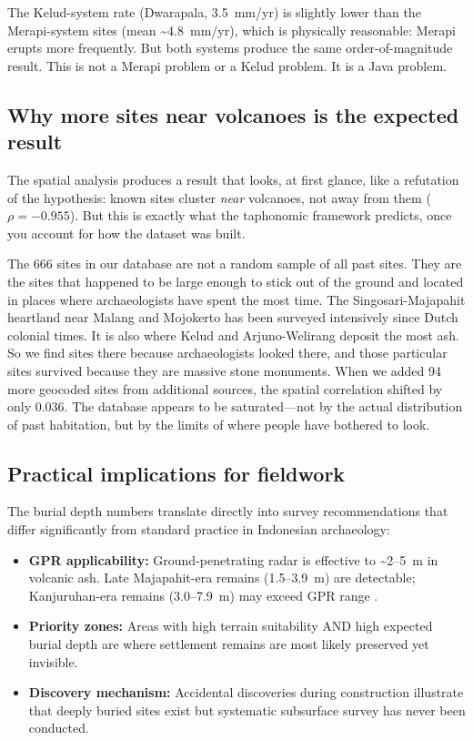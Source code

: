 \documentclass[egqsj, manuscript]{copernicus}
\begin{document}
The Kelud-system rate (Dwarapala, 3.5~mm/yr) is slightly lower than the Merapi-system sites (mean \textasciitilde4.8~mm/yr), which is physically reasonable: Merapi erupts more frequently. But both systems produce the same order-of-magnitude result. This is not a Merapi problem or a Kelud problem. It is a Java problem.

\subsection{Why more sites near volcanoes is the expected result}

The spatial analysis produces a result that looks, at first glance, like a refutation of the hypothesis: known sites cluster \textit{near} volcanoes, not away from them ($\rho = -0.955$). But this is exactly what the taphonomic framework predicts, once you account for how the dataset was built.

The 666 sites in our database are not a random sample of all past sites. They are the sites that happened to be large enough to stick out of the ground and located in places where archaeologists have spent the most time. The Singosari-Majapahit heartland near Malang and Mojokerto has been surveyed intensively since Dutch colonial times. It is also where Kelud and Arjuno-Welirang deposit the most ash. So we find sites there because archaeologists looked there, and those particular sites survived because they are massive stone monuments. When we added 94 more geocoded sites from additional sources, the spatial correlation shifted by only 0.036. The database appears to be saturated---not by the actual distribution of past habitation, but by the limits of where people have bothered to look.

\subsection{Practical implications for fieldwork}

The burial depth numbers translate directly into survey recommendations that differ significantly from standard practice in Indonesian archaeology:

\begin{itemize}
  \item \textbf{GPR applicability:} Ground-penetrating radar is effective to \textasciitilde2--5~m in volcanic ash. Late Majapahit-era remains (1.5--3.9~m) are detectable; Kanjuruhan-era remains (3.0--7.9~m) may exceed GPR range \citep{conyers2004}.
  \item \textbf{Priority zones:} Areas with high terrain suitability AND high expected burial depth are where settlement remains are most likely preserved yet invisible.
  \item \textbf{Discovery mechanism:} Accidental discoveries during construction illustrate that deeply buried sites exist but systematic subsurface survey has never been conducted.
\end{itemize}
\end{document}
